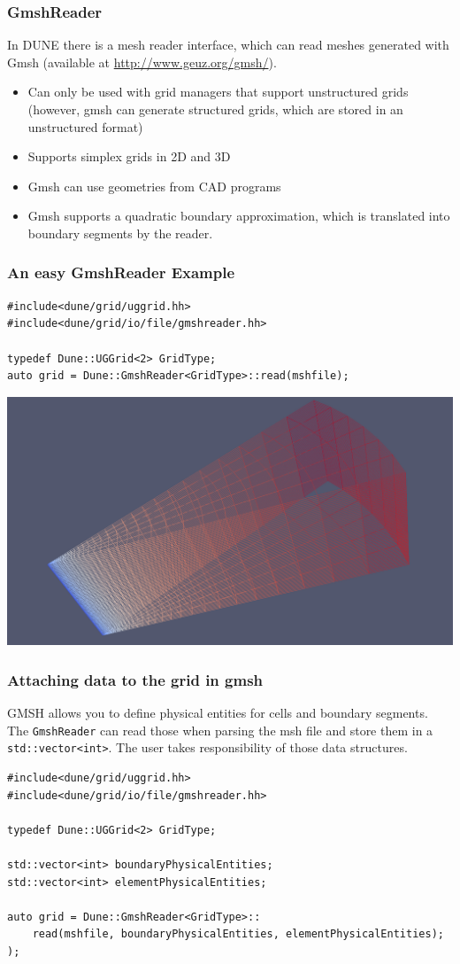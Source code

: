 \documentclass[ignorenonframetext,11pt]{beamer}
\theoremstyle{definition}
\begin{document}
\begin{frame}[fragile]
\frametitle{GmshReader}
In DUNE there is a mesh reader interface, which can
read meshes generated with Gmsh (available at \url{http://www.geuz.org/gmsh/}).
\begin{itemize}
\item Can only be used with grid managers that support unstructured grids
  (however, gmsh can generate structured grids, which are stored in an
  unstructured format)
\item Supports simplex grids in 2D and 3D
\item Gmsh can use geometries from CAD programs
\item Gmsh supports a quadratic boundary approximation, which is translated into
boundary segments by the reader.
\end{itemize}
\end{frame}

\begin{frame}[fragile]
\frametitle{An easy GmshReader Example}
\begin{lstlisting}[basicstyle=\scriptsize\ttfamily]
#include<dune/grid/uggrid.hh>
#include<dune/grid/io/file/gmshreader.hh>

typedef Dune::UGGrid<2> GridType;
auto grid = Dune::GmshReader<GridType>::read(mshfile);
\end{lstlisting}
\begin{center}
  \includegraphics[width=.8\textwidth]{figures/io/easygmsh.png}
\end{center}
\end{frame}

\begin{frame}[fragile]
\frametitle{Attaching data to the grid in gmsh}

GMSH allows you to define physical entities for cells and boundary segments.
The \lstinline!GmshReader! can read those when parsing the msh file and store
them in a \lstinline!std::vector<int>!. The user takes responsibility of those
data structures.
\begin{lstlisting}[basicstyle=\scriptsize\ttfamily]
#include<dune/grid/uggrid.hh>
#include<dune/grid/io/file/gmshreader.hh>

typedef Dune::UGGrid<2> GridType;

std::vector<int> boundaryPhysicalEntities;
std::vector<int> elementPhysicalEntities;

auto grid = Dune::GmshReader<GridType>::
    read(mshfile, boundaryPhysicalEntities, elementPhysicalEntities);
);
\end{lstlisting}
\end{frame}
\end{document}
